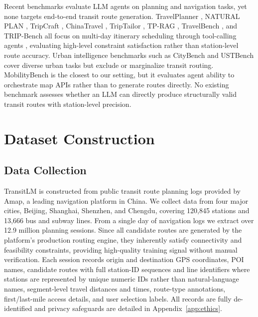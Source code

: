 \documentclass{article}
\begin{document}
Recent benchmarks evaluate LLM agents on planning and navigation tasks, yet none targets end-to-end transit route generation. TravelPlanner \cite{xie2024travelplanner}, NATURAL PLAN \cite{zheng2024naturalplan}, TripCraft \cite{chaudhuri2025tripcraft}, ChinaTravel \cite{shao2024chinatravel}, TripTailor \cite{wang2025triptailor}, TP-RAG \cite{chen2025tprag}, TravelBench \cite{cheng2025travelbench}, and TRIP-Bench \cite{shen2026tripbench} all focus on multi-day itinerary scheduling through tool-calling agents \cite{schick2023toolformer}, evaluating high-level constraint satisfaction rather than station-level route accuracy. Urban intelligence benchmarks such as CityBench \cite{feng2025citybench} and USTBench \cite{lai2025ustbench} cover diverse urban tasks but exclude or marginalize transit routing. MobilityBench \cite{song2026mobilitybench} is the closest to our setting, but it evaluates agent ability to orchestrate map APIs rather than to generate routes directly. No existing benchmark assesses whether an LLM can directly produce structurally valid transit routes with station-level precision.

\section{Dataset Construction}
\label{dataset}

\subsection{Data Collection}
\label{sec:collection}

TransitLM is constructed from public transit route planning logs provided by Amap, a leading navigation platform in China. We collect data from four major cities, Beijing, Shanghai, Shenzhen, and Chengdu, covering 120,845 stations and 13,666 bus and subway lines. From a single day of navigation logs we extract over 12.9 million planning sessions. Since all candidate routes are generated by the platform's production routing engine, they inherently satisfy connectivity and feasibility constraints, providing high-quality training signal without manual verification. Each session records origin and destination GPS coordinates, POI names, candidate routes with full station-ID sequences and line identifiers where stations are represented by unique numeric IDs rather than natural-language names, segment-level travel distances and times, route-type annotations, first/last-mile access details, and user selection labels. All records are fully de-identified and privacy safeguards are detailed in Appendix~\ref{app:ethics}.
\end{document}
